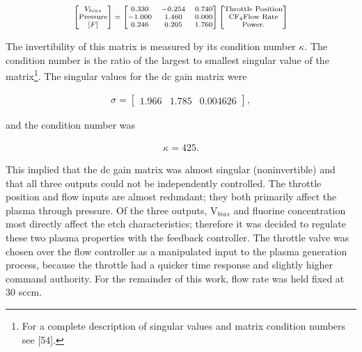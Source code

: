 \begin{align}
	\mbox{\scriptsize$\begin{bmatrix} V_{bias} \\ \text{Pressure} \\ [F]\end{bmatrix} = \begin{bmatrix}	0.330 & -0.254 & 0.740 \\ -1.000 & 1.460 & 0.000 \\ 0.246 & 0.205 & 1.760\end{bmatrix} \begin{bmatrix} \text{Throttle Position} \\ \text{CF}_{4} \text{Flow Rate} \\ \text{Power.}	\end{bmatrix}$}
\end{align}

\noindent The invertibility of this matrix is measured by its condition number $\kappa$. The condition number is the ratio of the largest to smallest singular value of the matrix\footnote{For a complete description of singular values and matrix condition numbers see [54].}. The singular values for the dc gain matrix were

\begin{align}
	\sigma = \begin{bmatrix} 1.966 & 1.785 & 0.004626 \end{bmatrix},
\end{align}

\noindent and the condition number was

\begin{align}
	\kappa=425.
\end{align}

\noindent This implied that the dc gain matrix was almost singular (noninvertible) and that all three outputs could not be independently controlled. The throttle position and flow inputs are almost redundant; they both primarily affect the plasma through pressure. Of the three outputs, $\text{V}_{bias}$ and fluorine concentration most directly affect the etch characteristics; therefore it was decided to regulate these two plasma properties with the feedback controller. The throttle valve was chosen over the flow controller as a manipulated input to the plasma generation process, because the throttle had a quicker time response and slightly higher command authority. For the remainder of this work, flow rate was held fixed at 30 sccm.

